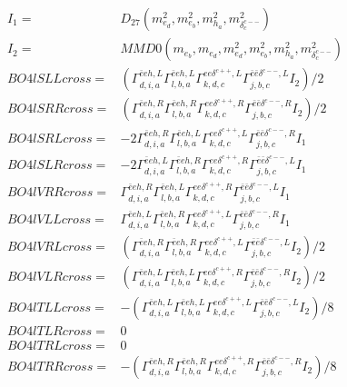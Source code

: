 \documentclass[A4,landscape]{article}
\begin{document}
\begin{align} 
I_1 = & D_{27}(m^2_{e_{{d}}}, m^2_{e_{{b}}}, m^2_{h_{{a}}}, m^2_{\delta^{c--}_{{c}}}) \\ 
I_2 = & MMD0(m_{e_{{b}}}, m_{e_{{d}}}, m^2_{e_{{d}}}, m^2_{e_{{b}}}, m^2_{h_{{a}}}, m^2_{\delta^{c--}_{{c}}}) \\ 
  BO4lSLLcross= & ( \Gamma^{\bar{e}e h ,L}_{d, i, a} \Gamma^{\bar{e}e h ,L}_{l, b, a} \Gamma^{e e \delta^{c++},L}_{k, d, c} \Gamma^{\bar{e}\bar{e}\delta^{c--} ,L}_{j, b, c} I_2)/2 \\ 
  BO4lSRRcross= & ( \Gamma^{\bar{e}e h ,R}_{d, i, a} \Gamma^{\bar{e}e h ,R}_{l, b, a} \Gamma^{e e \delta^{c++},R}_{k, d, c} \Gamma^{\bar{e}\bar{e}\delta^{c--} ,R}_{j, b, c} I_2)/2 \\ 
  BO4lSRLcross= & -2  \Gamma^{\bar{e}e h ,R}_{d, i, a} \Gamma^{\bar{e}e h ,L}_{l, b, a} \Gamma^{e e \delta^{c++},L}_{k, d, c} \Gamma^{\bar{e}\bar{e}\delta^{c--} ,R}_{j, b, c} I_1 \\ 
  BO4lSLRcross= & -2  \Gamma^{\bar{e}e h ,L}_{d, i, a} \Gamma^{\bar{e}e h ,R}_{l, b, a} \Gamma^{e e \delta^{c++},R}_{k, d, c} \Gamma^{\bar{e}\bar{e}\delta^{c--} ,L}_{j, b, c} I_1 \\ 
  BO4lVRRcross= &  \Gamma^{\bar{e}e h ,R}_{d, i, a} \Gamma^{\bar{e}e h ,L}_{l, b, a} \Gamma^{e e \delta^{c++},R}_{k, d, c} \Gamma^{\bar{e}\bar{e}\delta^{c--} ,L}_{j, b, c} I_1 \\ 
  BO4lVLLcross= &  \Gamma^{\bar{e}e h ,L}_{d, i, a} \Gamma^{\bar{e}e h ,R}_{l, b, a} \Gamma^{e e \delta^{c++},L}_{k, d, c} \Gamma^{\bar{e}\bar{e}\delta^{c--} ,R}_{j, b, c} I_1 \\ 
  BO4lVRLcross= & ( \Gamma^{\bar{e}e h ,R}_{d, i, a} \Gamma^{\bar{e}e h ,R}_{l, b, a} \Gamma^{e e \delta^{c++},L}_{k, d, c} \Gamma^{\bar{e}\bar{e}\delta^{c--} ,L}_{j, b, c} I_2)/2 \\ 
  BO4lVLRcross= & ( \Gamma^{\bar{e}e h ,L}_{d, i, a} \Gamma^{\bar{e}e h ,L}_{l, b, a} \Gamma^{e e \delta^{c++},R}_{k, d, c} \Gamma^{\bar{e}\bar{e}\delta^{c--} ,R}_{j, b, c} I_2)/2 \\ 
  BO4lTLLcross= & -( \Gamma^{\bar{e}e h ,L}_{d, i, a} \Gamma^{\bar{e}e h ,L}_{l, b, a} \Gamma^{e e \delta^{c++},L}_{k, d, c} \Gamma^{\bar{e}\bar{e}\delta^{c--} ,L}_{j, b, c} I_2)/8 \\ 
  BO4lTLRcross= & 0 \\ 
  BO4lTRLcross= & 0 \\ 
  BO4lTRRcross= & -( \Gamma^{\bar{e}e h ,R}_{d, i, a} \Gamma^{\bar{e}e h ,R}_{l, b, a} \Gamma^{e e \delta^{c++},R}_{k, d, c} \Gamma^{\bar{e}\bar{e}\delta^{c--} ,R}_{j, b, c} I_2)/8 \\ 
\end{align} 
\end{document}
